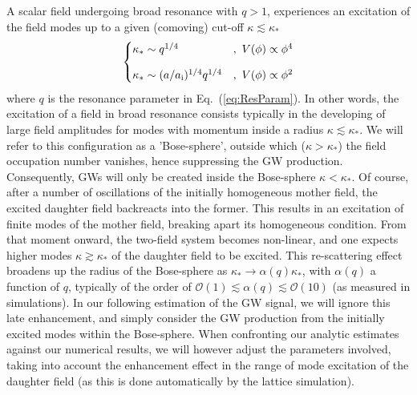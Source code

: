 \documentclass[a4paper,11pt]{article}
\begin{document}
A scalar field undergoing broad resonance with $q > 1$, experiences an excitation of the field modes up to a given (comoving) cut-off $\kappa \lesssim \kappa_*$~\cite{Kofman:1997yn,Greene:1997fu}
\begin{equation}
\label{eq:kF}
\begin{cases}
\kappa_{*}\sim q^{1/4} &, \,\, V(\phi)\propto\phi^{4}\vspace{0.3cm}\\
\kappa_{*}\sim(a/a_{\rm i})^{1/4}q^{1/4} &, \,\, V(\phi)\propto\phi^{2}
\end{cases}
\end{equation}
where $q$ is the resonance parameter in Eq.~(\ref{eq:ResParam}). In other words, the excitation of a field in broad resonance consists typically in the developing of large field amplitudes for modes with momentum inside a radius $\kappa \lesssim \kappa_{*}$. We will refer to this configuration as a 'Bose-sphere', outside which ($\kappa > \kappa_*$) the field occupation number vanishes, hence suppressing the GW production. Consequently, GWs will only be created inside the Bose-sphere $\kappa < \kappa_*$. Of course, after a number of oscillations of the initially homogeneous mother field, the excited daughter field backreacts into the former. This results in an excitation of finite modes of the mother field, breaking apart its homogeneous condition. From that moment onward, the two-field system becomes non-linear, and one expects higher modes $\kappa \gtrsim \kappa_*$ of the daughter field to be excited. This re-scattering effect broadens up the radius of the Bose-sphere as $\kappa_* \longrightarrow \alpha(q)\kappa_*$, with $\alpha(q)$ a function of $q$, typically of the order of $\mathcal{O}(1) \lesssim \alpha(q) \lesssim \mathcal{O}(10)$ (as measured in simulations). In our following estimation of the GW signal, we will ignore this late enhancement, and simply consider the GW production from the initially excited modes within the Bose-sphere. When confronting our analytic estimates against our numerical results, we will however adjust the parameters involved, taking into account the enhancement effect in the range of mode excitation of the daughter field (as this is done automatically by the lattice simulation).
\end{document}
